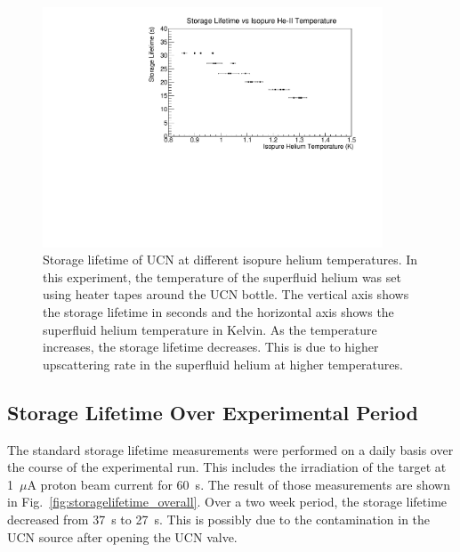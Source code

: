 \begin{figure}[h!]
  \centering
  \includegraphics[width=0.9\textwidth]{StorageLifetime_vs_temp.pdf}
  \caption{Storage lifetime of UCN at different isopure helium
    temperatures. In this experiment, the temperature of the
    superfluid helium was set using heater tapes around the UCN
    bottle. The vertical axis shows the storage lifetime in seconds
    and the horizontal axis shows the superfluid helium temperature in
    Kelvin. As the temperature increases, the storage lifetime
    decreases. This is due to higher upscattering rate in the
    superfluid helium at higher temperatures.}
  \label{fig:storagelifetime_vs_temp}
\end{figure}



\subsection{Storage Lifetime Over Experimental Period\label{sec:storage_overall}}

The standard storage lifetime measurements were performed on a daily
basis over the course of the experimental run. This includes the
irradiation of the target at 1~$\mu$A proton beam current for
60~s. The result of those measurements are shown in
Fig.~\ref{fig:storagelifetime_overall}. Over a two week period, the
storage lifetime decreased from 37~s to 27~s. This is possibly due to
the contamination in the UCN source after opening the UCN valve.


